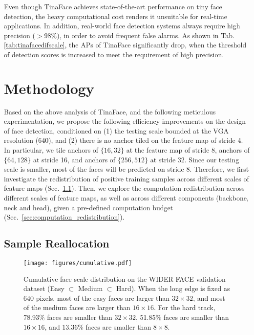 \documentclass[10pt,twocolumn,letterpaper]{article}
\begin{document}
Even though TinaFace achieves state-of-the-art performance on tiny face detection, the heavy computational cost renders it unsuitable for real-time applications. In addition, real-world face detection systems always require high precision (\eg $>98\%$), in order to avoid frequent false alarms. As shown in Tab. \ref{tab:tinafacedifscale}, the APs of TinaFace significantly drop, when the threshold of detection scores is increased to meet the requirement of high precision. 

\section{Methodology}

Based on the above analysis of TinaFace, and the following meticulous experimentation, we propose the following efficiency improvements on the design of face detection, conditioned on (1) the testing scale bounded at the VGA resolution ($640$), and (2) there is no anchor tiled on the feature map of stride 4. In particular, we tile anchors of $\{16, 32\}$ at the feature map of stride 8, anchors of $\{64, 128\}$ at stride 16, and anchors of $\{256, 512\}$ at stride 32. Since our testing scale is smaller, most of the faces will be predicted on stride 8. Therefore, we first investigate the redistribution of positive training samples across different scales of feature maps (Sec.~\ref{sec:sample_reallocation}). Then, we explore the computation redistribution across different scales of feature maps, as well as across different components (\ie backbone, neck and head), given a pre-defined computation budget (Sec.~\ref{sec:computation_redistribution}).

\subsection{Sample Reallocation}
\label{sec:sample_reallocation}
\begin{figure}[t!]
\centering
\texttt{[image: figures/cumulative.pdf]}
\caption{Cumulative face scale distribution on the WIDER FACE validation dataset (Easy $\subset$ Medium $\subset$ Hard). When the long edge is fixed as $640$ pixels, most of the easy faces are larger than $32 \times 32$, and most of the medium faces are larger than $16 \times 16$. For the hard track, 78.93\% faces are smaller than $32 \times 32$, 51.85\% faces are smaller than $16 \times 16$, and 13.36\% faces are smaller than $8 \times 8$.}
\vspace{-4mm}
\label{fig:cumulativewiderval}
\end{figure}
\end{document}
